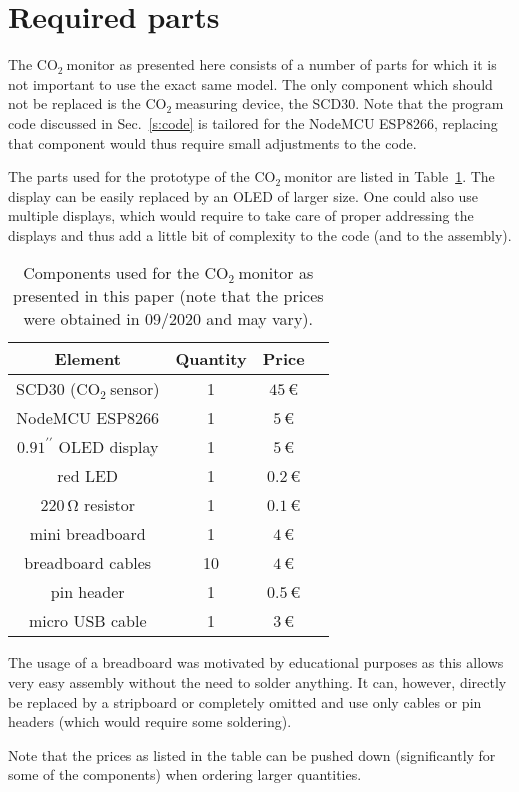 \documentclass[12pt,a4paper]{article}
\newcommand{\inchsign}{^{\prime\prime}}
\newcommand{\coo}{\ensuremath{\mathrm{CO_2}~}}
\begin{document}
\section{Required parts}
The \coo monitor as presented here consists of a number of parts for which it is not important to use the exact same model. The only component which should not be replaced is the \coo measuring device, the SCD30. Note that the program code discussed in Sec.~\ref{s:code} is tailored for the NodeMCU ESP8266, replacing that component would thus require small adjustments to the code. 

The parts used for the prototype of the \coo monitor are listed in Table~\ref{t:parts}. The display can be easily replaced by an OLED of larger size. One could also use multiple displays, which would require to take care of proper addressing the displays and thus add a little bit of complexity to the code (and to the assembly). 
\begin{table}\label{t:parts}
\center
\begin{tabular}{cccc}\toprule
Element & Quantity & Price \\\hline
SCD30 (\coo sensor) & 1 & $45\,$\euro \\
NodeMCU ESP8266 & 1 & $5\,$\euro \\
$0.91\inchsign$ OLED display	& 1	& $5\,$\euro \\
red LED					& 1 	& $0.2\,$\euro \\
$220\,\mathrm{\Omega}$ resistor	& 1	& $0.1\,$\euro \\
mini breadboard		& 1 & $4\,$\euro \\
breadboard cables	& 10 & $4\,$\euro \\
pin header			& 1 & $0.5\,$\euro \\
micro USB cable		& 1 & $3\,$\euro \\
\bottomrule
\end{tabular}
\caption{Components used for the \coo monitor as presented in this paper (note that the prices were obtained in 09/2020 and may vary).}
\end{table}

The usage of a breadboard was motivated by educational purposes as this allows very easy assembly without the need to solder anything. It can, however, directly be replaced by a stripboard or completely omitted and use only cables or pin headers (which would require some soldering). 

Note that the prices as listed in the table can be pushed down (significantly for some of the components) when ordering larger quantities. 
\end{document}
